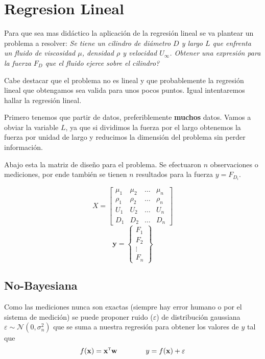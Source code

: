 \documentclass{article}
\newcommand{\vectorbold}[1]{\mathbf{#1}}
\newcommand{\T}{\textsc{t}}
\newcommand{\func}{f}
\newcommand{\GD}{\mathcal{N}}
\begin{document}
\section{Regresion Lineal}
Para que sea mas didáctico la aplicación de la regresión lineal se va plantear un problema a resolver:
\textit{Se tiene un cilindro de diámetro $D$ y largo $L$ que enfrenta un fluido de viscosidad $\mu$, densidad $\rho$ y velocidad $U_\infty$. Obtener una expresión para la fuerza $F_D$ que el fluido ejerce sobre el cilindro?}

Cabe destacar que el problema no es lineal y que probablemente la regresión lineal que obtengamos sea valida para unos pocos puntos. Igual intentaremos hallar la regresión lineal.

Primero tenemos que partir de datos, preferiblemente \textbf{muchos} datos. Vamos a obviar la variable $L$, ya que si dividimos la fuerza por el largo obtenemos la fuerza por unidad de largo y reducimos la dimensión del problema sin perder información.

Abajo esta la matriz de diseño para el problema. Se efectuaron $n$ observaciones o mediciones, por ende también se tienen $n$ resultados para la fuerza $y=F_{D_i}$.

\[X=
\begin{bmatrix}
\mu_1 & \mu_2 &\ldots& \mu_n \\
\rho_1 &\rho _2 &\ldots &\rho_n \\
U_{1} & U_{2}&\ldots & U_{n}\\
D_1 & D_2 & \ldots& D_n
\end{bmatrix}
\]
\[
\vectorbold{y} = 
\begin{Bmatrix}
F_1 \\
F_2 \\
\vdots\\
F_n
\end{Bmatrix}
\]

\subsection{No-Bayesiana}
Como las mediciones nunca son exactas (siempre hay error humano o por el sistema de medición) se puede proponer ruido ($\varepsilon$) de distribución gaussiana $\varepsilon \sim \GD (0,\sigma_{n}^{2})$ que se suma a nuestra regresión para obtener los valores de $y$ tal que 
\[
\func(\vectorbold{x})=\vectorbold{x}^{\T} \vectorbold{w} \qquad \qquad y=\func(\vectorbold{x})+\varepsilon
\]
\end{document}
